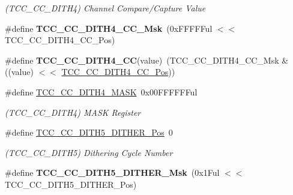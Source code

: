 \begin{DoxyCompactItemize}
\begin{DoxyCompactList}\small\item\em (T\+C\+C\+\_\+\+C\+C\+\_\+\+D\+I\+T\+H4) Channel Compare/\+Capture Value \end{DoxyCompactList}\item 
\hypertarget{group___s_a_m_l21___t_c_c_gada1f9393d3d71ce9fd2d17d56a89f1f1}{}\#define {\bfseries T\+C\+C\+\_\+\+C\+C\+\_\+\+D\+I\+T\+H4\+\_\+\+C\+C\+\_\+\+Msk}~(0x\+F\+F\+F\+F\+Ful $<$$<$ T\+C\+C\+\_\+\+C\+C\+\_\+\+D\+I\+T\+H4\+\_\+\+C\+C\+\_\+\+Pos)\label{group___s_a_m_l21___t_c_c_gada1f9393d3d71ce9fd2d17d56a89f1f1}

\item 
\hypertarget{group___s_a_m_l21___t_c_c_ga2eed2b3a040b813140afa1b52c5fe7d7}{}\#define {\bfseries T\+C\+C\+\_\+\+C\+C\+\_\+\+D\+I\+T\+H4\+\_\+\+C\+C}(value)~(T\+C\+C\+\_\+\+C\+C\+\_\+\+D\+I\+T\+H4\+\_\+\+C\+C\+\_\+\+Msk \& ((value) $<$$<$ \hyperlink{group___s_a_m_l21___t_c_c_ga92b4f7c07cbbac0d6154d1833d5b5b48}{T\+C\+C\+\_\+\+C\+C\+\_\+\+D\+I\+T\+H4\+\_\+\+C\+C\+\_\+\+Pos}))\label{group___s_a_m_l21___t_c_c_ga2eed2b3a040b813140afa1b52c5fe7d7}

\item 
\hypertarget{group___s_a_m_l21___t_c_c_ga26c317e665ea781907ade59f70da9150}{}\#define \hyperlink{group___s_a_m_l21___t_c_c_ga26c317e665ea781907ade59f70da9150}{T\+C\+C\+\_\+\+C\+C\+\_\+\+D\+I\+T\+H4\+\_\+\+M\+A\+S\+K}~0x00\+F\+F\+F\+F\+F\+Ful\label{group___s_a_m_l21___t_c_c_ga26c317e665ea781907ade59f70da9150}

\begin{DoxyCompactList}\small\item\em (T\+C\+C\+\_\+\+C\+C\+\_\+\+D\+I\+T\+H4) M\+A\+S\+K Register \end{DoxyCompactList}\item 
\hypertarget{group___s_a_m_l21___t_c_c_gad9c8e023604fc91b228eb08efe2560e4}{}\#define \hyperlink{group___s_a_m_l21___t_c_c_gad9c8e023604fc91b228eb08efe2560e4}{T\+C\+C\+\_\+\+C\+C\+\_\+\+D\+I\+T\+H5\+\_\+\+D\+I\+T\+H\+E\+R\+\_\+\+Pos}~0\label{group___s_a_m_l21___t_c_c_gad9c8e023604fc91b228eb08efe2560e4}

\begin{DoxyCompactList}\small\item\em (T\+C\+C\+\_\+\+C\+C\+\_\+\+D\+I\+T\+H5) Dithering Cycle Number \end{DoxyCompactList}\item 
\hypertarget{group___s_a_m_l21___t_c_c_ga33afbacc0fff5f6681b6677598d109aa}{}\#define {\bfseries T\+C\+C\+\_\+\+C\+C\+\_\+\+D\+I\+T\+H5\+\_\+\+D\+I\+T\+H\+E\+R\+\_\+\+Msk}~(0x1\+Ful $<$$<$ T\+C\+C\+\_\+\+C\+C\+\_\+\+D\+I\+T\+H5\+\_\+\+D\+I\+T\+H\+E\+R\+\_\+\+Pos)\label{group___s_a_m_l21___t_c_c_ga33afbacc0fff5f6681b6677598d109aa}


\end{DoxyCompactItemize}
